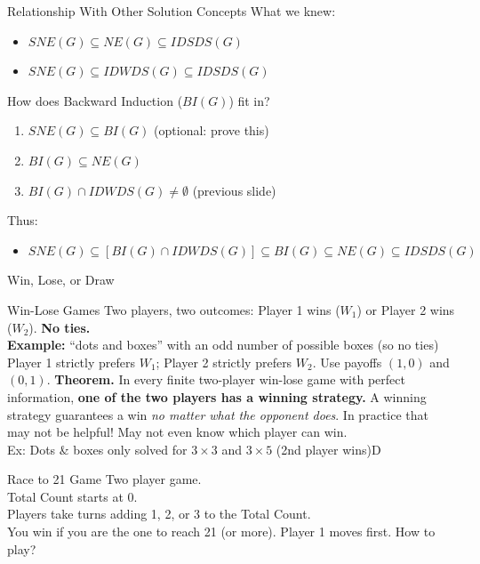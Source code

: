 \begin{frame}{Relationship With Other Solution Concepts}
What we knew:
\begin{itemize}
    \item $SNE(G)\subseteq NE(G) \subseteq IDSDS(G)$
    \item $SNE(G) \subseteq IDWDS(G) \subseteq IDSDS(G)$
\end{itemize}
\bsk
How does Backward Induction ($BI(G)$) fit in?
\begin{enumerate}
    \item $SNE(G)\subseteq BI(G)$ (optional: prove this)
    \item $BI(G)\subseteq NE(G)$
    \item $BI(G)\cap IDWDS(G) \neq \emptyset$ (previous slide)
\end{enumerate}
\bsk
Thus:
\begin{itemize}
    \item $SNE(G) \subseteq [BI(G)\cap IDWDS(G)] \subseteq BI(G) \subseteq NE(G) \subseteq IDSDS(G)$
\end{itemize}

\end{frame}


\begin{frame}[standout]
Win, Lose, or Draw
\end{frame}

\begin{frame}{Win-Lose Games}
Two players, two outcomes: Player 1 wins ($W_1$) or Player 2 wins ($W_2$). \textbf{No ties.}\\
\textbf{Example:} ``dots and boxes'' with an odd number of possible boxes (so no ties)
\bsk
Player 1 strictly prefers $W_1$; Player 2 strictly prefers $W_2$. Use payoffs
$(1,0)$ and $(0,1)$.
\vfill
\textbf{Theorem.} In every finite two-player win-lose game with perfect information,
\textbf{one of the two players has a winning strategy.}
\vfill
A winning strategy guarantees a win \textit{no matter what the opponent does}.
\bsk
In practice that may not be helpful! May not even know which player can win.\\ 
Ex: Dots \& boxes only solved for $3\times 3$ and $3\times 5$ (2nd player wins)D
\end{frame}

\begin{frame}{Race to 21 Game}
Two player game.\\
Total Count starts at 0.\\
Players take turns adding 1, 2, or 3 to the Total Count.\\
You win if you are the one to reach 21 (or more).
\bsk
Player 1 moves first.
\vfill
How to play?
\vfill
\end{frame}

